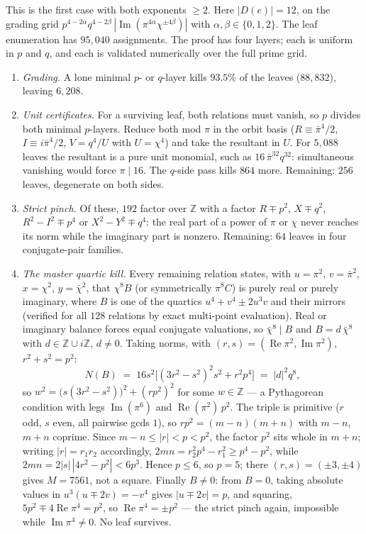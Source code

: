 \documentclass[11pt]{article}
\theoremstyle{remark}
\DeclareMathOperator{\im}{Im}
\DeclareMathOperator{\re}{Re}
\begin{document}
This is the first case with both exponents $\ge 2$.  Here $|D(e)|=12$, on the
grading grid $p^{4-2\alpha}q^{4-2\beta}\,|\!\im(\pi^{4\alpha}\chi^{\pm4\beta})|$
with $\alpha,\beta\in\{0,1,2\}$.  The leaf enumeration has $95{,}040$
assignments.  The proof has four layers; each is uniform in $p$ and $q$, and
each is validated numerically over the full prime grid.
\begin{enumerate}
\item \emph{Grading.}  A lone minimal $p$- or $q$-layer kills $93.5\%$ of the
leaves ($88{,}832$), leaving $6{,}208$.
\item \emph{Unit certificates.}  For a surviving leaf, both relations must
vanish, so $p$ divides both minimal $p$-layers.  Reduce both mod $\pi$ in the
orbit basis ($R\equiv\bar\pi^4/2$, $I\equiv i\bar\pi^4/2$, $V=q^4/U$ with
$U=\chi^4$) and take the resultant in $U$.  For $5{,}088$ leaves the resultant
is a pure unit monomial, such as $16\,\bar\pi^{32}q^{32}$: simultaneous
vanishing would force $\pi\mid 16$.  The $q$-side pass kills $864$ more.
Remaining: $256$ leaves, degenerate on both sides.
\item \emph{Strict pinch.}  Of these, $192$ factor over $\mathbb{Z}$ with a
factor $R\mp p^2$, $X\mp q^2$, $R^2-I^2\mp p^4$ or $X^2-Y^2\mp q^4$: the real
part of a power of $\pi$ or $\chi$ never reaches its norm while the imaginary
part is nonzero.  Remaining: $64$ leaves in four conjugate-pair families.
\item \emph{The master quartic kill.}  Every remaining relation states, with
$u=\pi^2$, $v=\bar\pi^2$, $x=\chi^2$, $y=\bar\chi^2$, that
$\chi^8 B$ (or symmetrically $\pi^8 C$) is purely real or purely imaginary,
where $B$ is one of the quartics $u^4+v^4\pm2u^3v$ and their mirrors
(verified for all $128$ relations by exact multi-point evaluation).  Real or
imaginary balance forces equal conjugate valuations, so $\bar\chi^8\mid B$ and
$B=d\,\bar\chi^8$ with $d\in\mathbb{Z}\cup i\mathbb{Z}$, $d\neq0$.  Taking norms, with
$(r,s)=(\re\pi^2,\im\pi^2)$, $r^2+s^2=p^2$:
\[
  N(B) \;=\; 16s^2\bigl[(3r^2-s^2)^2s^2 + r^2p^4\bigr] \;=\; |d|^2q^8,
\]
so $w^2=\bigl(s(3r^2-s^2)\bigr)^2+(rp^2)^2$ for some $w\in\mathbb{Z}$ — a
Pythagorean condition with legs $\im(\pi^6)$ and $\re(\pi^2)\,p^2$.  The
triple is primitive ($r$ odd, $s$ even, all pairwise gcds $1$), so
$rp^2=(m-n)(m+n)$ with $m-n$, $m+n$ coprime.  Since $m-n\le |r|<p<p^2$, the
factor $p^2$ sits whole in $m+n$; writing $|r|=r_1r_2$ accordingly,
$2mn=r_2^2p^4-r_1^2\ge p^4-p^2$, while $2mn=2|s|\,|4r^2-p^2|<6p^3$.  Hence
$p\le 6$, so $p=5$; there $(r,s)=(\pm3,\pm4)$ gives
$M=7561$, not a square.  Finally $B\neq 0$: from $B=0$, taking absolute
values in $u^3(u\mp 2v)=-v^4$ gives $|u\mp 2v|=p$, and squaring,
$5p^2\mp 4\re\pi^4=p^2$, so $\re\pi^4=\pm p^2$ --- the strict pinch
again, impossible while $\im\pi^4\neq0$.  No leaf survives.
\end{enumerate}
\end{document}
